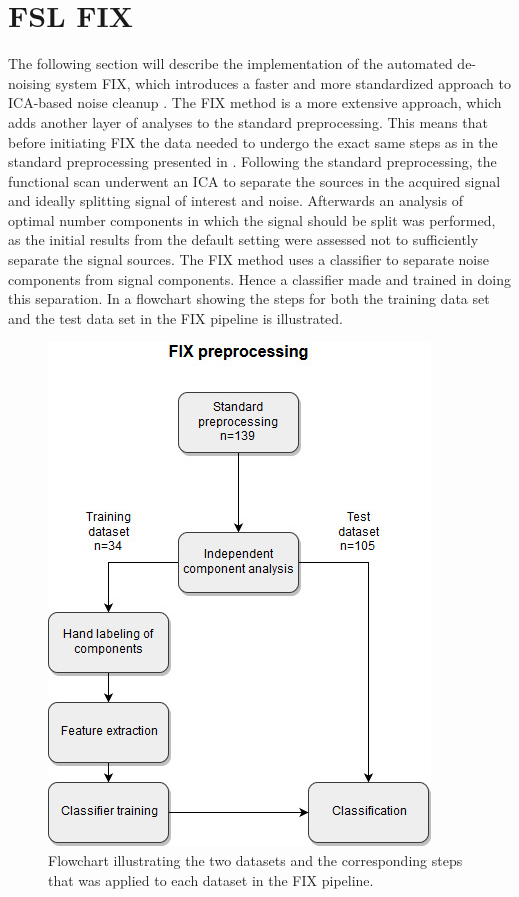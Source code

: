 
\section{FSL FIX}

The following section will describe the implementation of the automated de-noising system FIX, which introduces a faster and more standardized approach to ICA-based noise cleanup \cite{Salimi-Khorshidi2014}. The FIX method is a more extensive approach, which adds another layer of analyses to the standard preprocessing. This means that before initiating FIX the data needed to undergo the exact same steps as in the standard preprocessing presented in . Following the standard preprocessing, the functional scan underwent an ICA to separate the sources in the acquired signal and ideally splitting signal of interest and noise. Afterwards an analysis of optimal number components in which the signal should be split was performed, as the initial results from the default setting were assessed not to sufficiently separate the signal sources. The FIX method uses a classifier to separate noise components from signal components. Hence a classifier made and trained in doing this separation. In  a flowchart showing the steps for both the training data set and the test data set in the FIX pipeline is illustrated. 


\begin{figure}[H]                 
	\includegraphics[width=.6\textwidth]{figures/bMethods/FIX_flow} 
	\caption{Flowchart illustrating the two datasets and the corresponding steps that was applied to each dataset in the FIX pipeline.}
	\label{fig:meth:fix} 
\end{figure}

